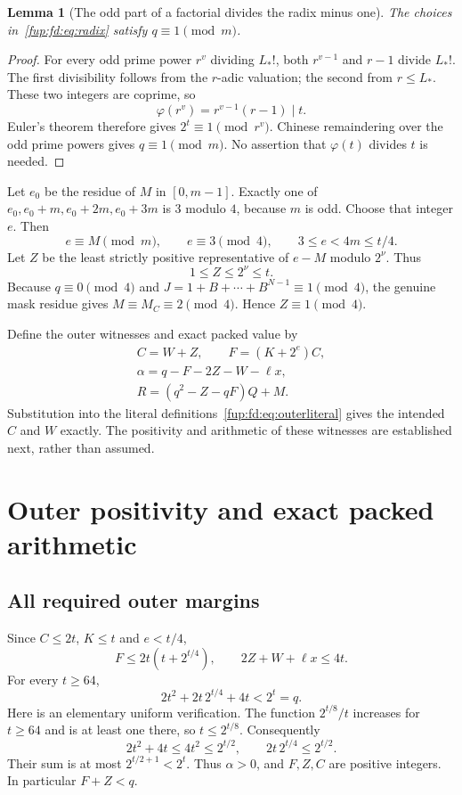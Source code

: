 \documentclass[11pt,letterpaper]{article}
\newtheorem{lemma}[theorem]{Lemma}
\theoremstyle{definition}\newtheorem{definition}[theorem]{Definition}
\theoremstyle{remark}\newtheorem{remark}[theorem]{Remark}
\newcommand{\MC}{M_C}
\begin{document}
\begin{lemma}[The odd part of a factorial divides the radix minus one]\label{fup:fd:lem:factorial}
The choices in~\eqref{fup:fd:eq:radix} satisfy $q\equiv1\pmod m$.
\end{lemma}
\begin{proof}
For every odd prime power $r^v$ dividing $L_*!$, both $r^{v-1}$ and $r-1$ divide $L_*!$. The first divisibility follows from the $r$-adic valuation; the second from $r\le L_*$. These two integers are coprime, so
\[
 \varphi(r^v)=r^{v-1}(r-1)\mid t.
\]
Euler's theorem therefore gives $2^t\equiv1\pmod{r^v}$. Chinese remaindering over the odd prime powers gives $q\equiv1\pmod m$. No assertion that $\varphi(t)$ divides $t$ is needed.
\end{proof}

Let $e_0$ be the residue of $M$ in $[0,m-1]$. Exactly one of
$e_0,e_0+m,e_0+2m,e_0+3m$ is $3$ modulo $4$, because $m$ is odd. Choose that integer $e$. Then
\begin{equation}\label{fup:fd:eq:e}
 e\equiv M\pmod m,\qquad e\equiv3\pmod4,
 \qquad 3\le e<4m\le t/4.
\end{equation}
Let $Z$ be the least strictly positive representative of $e-M$ modulo $2^\nu$. Thus
\[
 1\le Z\le2^\nu\le t.
\]
Because $q\equiv0\pmod4$ and $J=1+B+\cdots+B^{N-1}\equiv1\pmod4$, the genuine mask residue gives $M\equiv\MC\equiv2\pmod4$. Hence $Z\equiv1\pmod4$.

Define the outer witnesses and exact packed value by
\begin{equation}\label{fup:fd:eq:outerconstruction}
 \begin{gathered}
 C=W+Z,\qquad F=(K+2^e)C,\\
 \alpha=q-F-2Z-W-\ell x,\\
 R=(q^2-Z-qF)Q+M.
 \end{gathered}
\end{equation}
Substitution into the literal definitions~\eqref{fup:fd:eq:outerliteral} gives the intended $C$ and $W$ exactly. The positivity and arithmetic of these witnesses are established next, rather than assumed.

\section{Outer positivity and exact packed arithmetic}\label{fup:fd:sec:packing}
\subsection{All required outer margins}
Since $C\le2t$, $K\le t$ and $e<t/4$,
\[
 F\le2t(t+2^{t/4}),\qquad 2Z+W+\ell x\le4t.
\]
For every $t\ge64$,
\begin{equation}\label{fup:fd:eq:margin}
 2t^2+2t\,2^{t/4}+4t<2^t=q.
\end{equation}
Here is an elementary uniform verification. The function $2^{t/8}/t$ increases for $t\ge64$ and is at least one there, so $t\le2^{t/8}$. Consequently
\[
 2t^2+4t\le4t^2\le2^{t/2},\qquad
 2t\,2^{t/4}\le2^{t/2}.
\]
Their sum is at most $2^{t/2+1}<2^t$. Thus $\alpha>0$, and $F,Z,C$ are positive integers. In particular $F+Z<q$.
\end{document}
